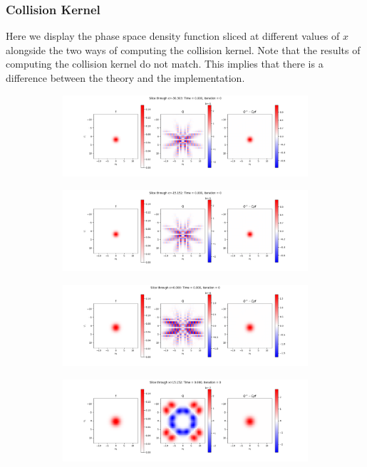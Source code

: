 \documentclass{article}
\begin{document}
\subsubsection{Collision Kernel}
Here we display the phase space density function sliced at different values of $x$ alongside the two ways of computing the collision kernel. Note that the results of computing the collision kernel do not match. This implies that there is a difference between the theory and the implementation.
\begin{figure}[H]
  \begin{subfigure}[b]{\textwidth}
    \includegraphics[width=\textwidth]{imgs/ts_output2/slice0/mat0.png}
  \end{subfigure}
  \hfill
  \begin{subfigure}[b]{\textwidth}
    \includegraphics[width=\textwidth]{imgs/ts_output2/slice25/mat0.png}
  \end{subfigure}
  \hfill
  \begin{subfigure}[b]{\textwidth}
    \includegraphics[width=\textwidth]{imgs/ts_output2/slice50/mat0.png}
  \end{subfigure}
  \hfill
  \begin{subfigure}[b]{\textwidth}
    \includegraphics[width=\textwidth]{imgs/ts_output2/slice75/mat0.png}
  \end{subfigure}
\end{figure}
\end{document}
